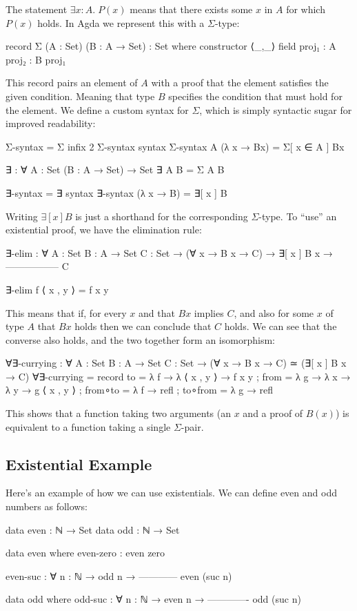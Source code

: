 \documentclass{lecturenotes}
\begin{document}
The statement $\exists x : A.\; P(x)$ means that there exists some $x$ in $A$ for which $P(x)$ holds. In Agda we represent this with a $\Sigma$-type:
\begin{code}
record Σ (A : Set) (B : A → Set) : Set where
  constructor ⟨_,_⟩
  field
    proj₁ : A
    proj₂ : B proj₁
\end{code}
This record pairs an element of $A$ with a proof that the element satisfies the given condition. 
Meaning that type $B$ specifies the condition that must hold for the element.
\newline \newline
We define a custom syntax for $\Sigma$, which is simply syntactic sugar for improved readability:
\begin{code}
Σ-syntax = Σ
infix 2 Σ-syntax
syntax Σ-syntax A (λ x → Bx) = Σ[ x ∈ A ] Bx

∃ : ∀ {A : Set} (B : A → Set) → Set
∃ {A} B = Σ A B

∃-syntax = ∃
syntax ∃-syntax (λ x → B) = ∃[ x ] B
\end{code}
Writing $\exists[ x ] B$ is just a shorthand for the corresponding $\Sigma$-type.
\newline \newline
To “use” an existential proof, we have the elimination rule:
\begin{code}
∃-elim : ∀ {A : Set} {B : A → Set} {C : Set} →
  (∀ x → B x → C) →
    ∃[ x ] B x →
  -----------------
        C

∃-elim f ⟨ x , y ⟩ = f x y
\end{code}
This means that if, for every $x$ and that $B x$ implies $C$, 
and also for some $x$ of type $A$ that $B x$ holds then we can conclude that $C$ holds.
\newline 
We can see that the converse also holds, and the two together form an isomorphism:
\begin{code}
∀∃-currying : ∀ {A : Set} {B : A → Set} {C : Set}
  → (∀ x → B x → C) ≃ (∃[ x ] B x → C)
∀∃-currying =
  record
  {
     to      = λ {f → λ { ⟨ x , y ⟩ → f x y } }
   ; from    = λ {g → λ x → λ y → g ⟨ x , y ⟩ }
   ; from∘to = λ f → refl
   ; to∘from = λ g → refl
   }
\end{code}
This shows that a function taking two arguments (an $x$ and a proof of $B(x)$) is equivalent to a function taking a single $\Sigma$-pair.

\subsection{Existential Example}
Here's an example of how we can use existentials.
We can define even and odd numbers as follows:
\begin{code}
data even : ℕ → Set
data odd : ℕ → Set

data even where
  even-zero : even zero

  even-suc : ∀ {n : ℕ} →
        odd n →
     ------------
     even (suc n)

data odd where
  odd-suc : ∀ {n : ℕ} →
      even n →
   -------------
    odd (suc n)
\end{code}
\end{document}
